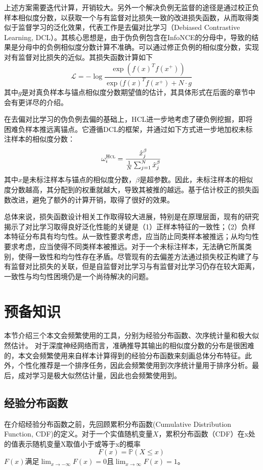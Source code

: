上述方案需要迭代计算，开销较大。另外一个解决负例无监督的途径是通过校正负样本相似度分数，以获取一个与有监督对比损失一致的改进损失函数，从而取得类似于监督学习的泛化效果，代表工作是去偏对比学习\cite{Chuang:2020:NIPS}（Debiased Contrastive Learning, DCL）。其核心思想是，由于伪负例包含在InfoNCE的分母中，导致的结果是分母中的负例相似度分数计算不准确。可以通过修正负例的相似度分数，实现对有监督对比损失的近似。其损失函数计算如下
\[
\mathcal{L} = -\log \frac{\exp(f(x)^Tf(x^+))}{\exp(f(x)^Tf(x^+) + N\cdot g}
\]
其中$g$是对真负样本与锚点相似度分数期望值的估计，其具体形式在后面的章节中会有更详尽的介绍。

在去偏对比学习\cite{Chuang:2020:NIPS}的伪负例去偏的基础上，HCL\cite{Robinson:2021:ICLR}进一步地考虑了硬负例挖掘，即将困难负样本推远离锚点。它遵循DCL的框架，并通过如下方式进一步地加权未标注样本的相似度分数：
\[\omega_i^\textsc{Hcl} = \frac{\hat{x}_j^\beta}{\frac{1}{N} \sum_{j=1}^{N}\hat{x}_j^\beta}
\]
其中$\hat{x}$是未标注样本与锚点的相似度分数，$\beta$是超参数。因此，未标注样本的相似度分数越高，其分配到的权重就越大，导致其被推的越远。基于估计校正的损失函数改进，避免了额外的计算开销，取得了很好的效果。

总体来说，损失函数设计相关工作取得较大进展，特别是在原理层面，现有的研究揭示了对比学习取得良好泛化性能的关键是（1）正样本特征的一致性；（2）负样本特征分布具有均匀性\cite{Wang:2020:ICML,Arora:2019:ICML}。从一致性要求考虑，应当防止同类样本被推远；从均匀性要求考虑，应当使得不同类样本被推远。对于一个未标注样本，无法确它所属类别，使得一致性和均匀性存在矛盾。尽管现有的去偏差方法通过损失校正构建了与有监督对比损失的关联，但是自监督对比学习与有监督对比学习仍存在较大距离，一致性与均匀性困境仍是一个尚待解决的问题\cite{Feng:2021:CVPR,zhang:cl}。

\section{预备知识}
本节介绍三个本文会频繁使用的工具，分别为经验分布函数、次序统计量和极大似然估计。
对于深度神经网络而言，准确推导其输出的相似度分数的分布是很困难的，本文会频繁使用来自样本计算得到的经验分布函数来刻画总体分布特征。此外，个性化推荐是一个排序任务，因此会频繁使用到次序统计量用于排序分析。最后，成对学习是极大似然估计量，因此也会频繁使用到。


\subsection{经验分布函数}\label{ecdf}
在介绍经验分布函数之前，先回顾累积分布函数(Cumulative Distribution Function, CDF)的定义。对于一个实值随机变量$X$，累积分布函数（CDF）在x处的值表示随机变量X取值小于或等于x的概率
\[F(x) = \mathbb P (X\leq x)\]
$F(x)$满足${\displaystyle \lim _{x\rightarrow -\infty }F(x)=0}$且${\displaystyle \lim _{x\rightarrow \infty }F(x)=1}$。

